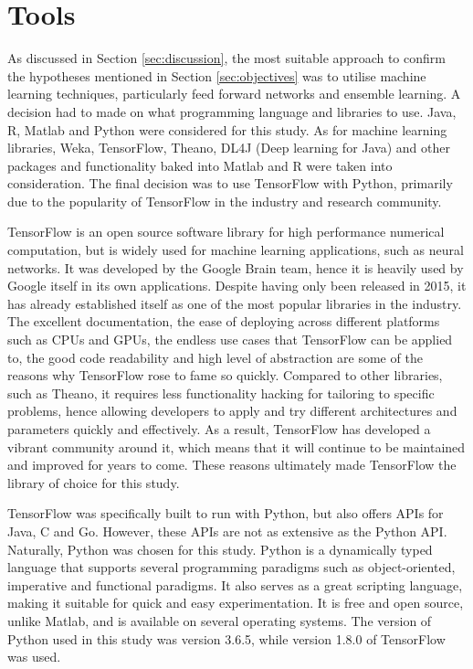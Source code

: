 \documentclass{UoYCSproject}
\begin{document}
\section{Tools}
As discussed in Section \ref{sec:discussion}, the most suitable approach to confirm the hypotheses mentioned in Section \ref{sec:objectives} was to utilise machine learning techniques, particularly feed forward networks and ensemble learning. A decision had to made on what programming language and libraries to use. Java, R, Matlab and Python were considered for this study. As for machine learning libraries, Weka, TensorFlow, Theano, DL4J (Deep learning for Java) and other packages and functionality baked into Matlab and R were taken into consideration. The final decision was to use TensorFlow with Python, primarily due to the popularity of TensorFlow in the industry and research community. 

TensorFlow is an open source software library for high performance numerical computation, but is widely used for machine learning applications, such as neural networks. It was developed by the Google Brain team, hence it is heavily used by Google itself in its own applications. Despite having only been released in 2015, it has already established itself as one of the most popular libraries in the industry. The excellent documentation, the ease of deploying across different platforms such as CPUs and GPUs, the endless use cases that TensorFlow can be applied to, the good code readability and high level of abstraction are some of the reasons why TensorFlow rose to fame so quickly. Compared to other libraries, such as Theano, it requires less functionality hacking for tailoring to specific problems, hence allowing developers to apply and try different architectures and parameters quickly and effectively. As a result, TensorFlow has developed a vibrant community around it, which means that it will continue to be maintained and improved for years to come. These reasons ultimately made TensorFlow the library of choice for this study.         

TensorFlow was specifically built to run with Python, but also offers APIs for Java, C and Go. However, these APIs are not as extensive as the Python API. Naturally, Python was chosen for this study. Python is a dynamically typed language that supports several programming paradigms such as object-oriented, imperative and functional paradigms. It also serves as a great scripting language, making it suitable for quick and easy experimentation. It is free and open source, unlike Matlab, and is available on several operating systems. The version of Python used in this study was version 3.6.5, while version 1.8.0 of TensorFlow was used.
\end{document}
